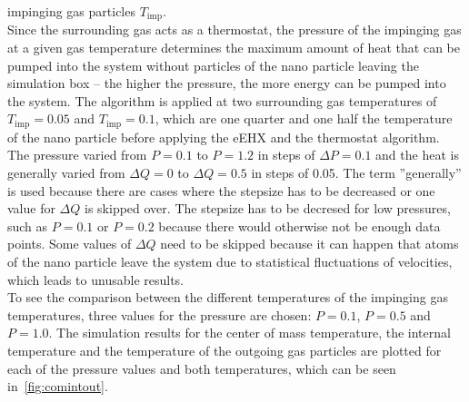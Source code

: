\documentclass[12pt]{article}
\begin{document}
impinging gas particles $T_\text{imp}$.\\
Since the surrounding gas acts as a thermostat, the pressure of the impinging gas at a given gas temperature determines the maximum amount of heat that
can be pumped into the system without particles of the nano particle leaving the simulation box -- the higher the pressure, the more energy can be
pumped into the system. The algorithm is applied at two surrounding gas temperatures of $T_\text{imp} = 0.05$ and $T_\text{imp} = 0.1$, 
which are one quarter and one half the temperature of the nano particle before applying the eEHX and the thermostat algorithm. The pressure varied
from $P=0.1$ to $P=1.2$ in steps of $\Delta P=0.1$ and the heat is generally varied from $\Delta Q=0$ to $\Delta Q=0.5$ in steps of 0.05. The term
''generally'' is used because there are cases where the stepsize has to be decreased or one value for $\Delta Q$ is skipped over. The stepsize has to
be decresed for low pressures, such as $P=0.1$ or $P=0.2$ because there would otherwise not be enough data points. Some values of $\Delta Q$ need to
be skipped because it can happen that atoms of the nano particle leave the system due to statistical fluctuations of velocities, which leads to
unusable results.\\
To see the comparison between the different temperatures of the impinging gas temperatures, three values for the pressure are chosen: $P=0.1$, $P=0.5$
and $P=1.0$. The simulation results for the center of mass temperature, the internal temperature and the temperature of the outgoing gas particles are
plotted for each of the pressure values and both temperatures, which can be seen in~\ref{fig:comintout}.
\end{document}
